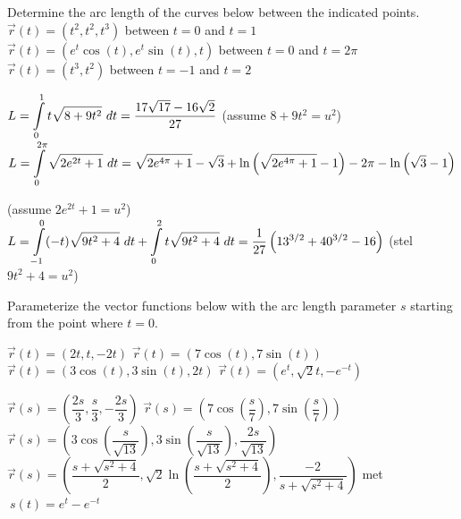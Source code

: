 \subsection*{}     
\begin{Exercise} Determine the arc length of the curves below between the indicated points.
         \Question[difficulty=1] $\vec r(t) = \left(t^2, t^2, t^3 \right)$ \qquad  between \quad $t=0$ and $t=1$
         \Question[difficulty=3] $\vec r(t) = \left(e^t \cos(t), e^t \sin(t), t \right)$ \qquad  between \quad $t=0$ and $t=2\pi$
         \Question[difficulty=2] $\vec r(t) = \left(t^3, t^2 \right)$ \qquad between \quad $t=-1$ and $t=2$
\end{Exercise}

\begin{Answer}
    
         \Question 
         $L =\displaystyle \int\limits_0^1 t \sqrt{8+9t^2}\ dt = \dfrac{17 \sqrt{17} - 16 \sqrt{2}}{27}$ \qquad (assume $8+9t^2 = u^2$)
         \Question
          $L = \displaystyle \int\limits_0^{2\pi}  \sqrt{2e^{2t}+1}\ dt = \sqrt{2e^{4 \pi}+1}-\sqrt{3}+\ln \left(\sqrt{2e^{4 \pi}+1} -1 \right) - 2 \pi - \ln \left( \sqrt{3}-1 \right)$ 
          
           (assume $2e^{2t}+1 = u^2$)
          \Question 
          $L = \displaystyle \int\limits_{-1}^0 (-t) \sqrt{9t^2+4}\ dt + \int\limits_{0}^2 t \sqrt{9t^2+4}\ dt = \dfrac{1}{27} \left( 13^{3/2} + 40^{3/2} - 16\right)$ \qquad (stel $9t^2 + 4 = u^2$)
     
\end{Answer}

\begin{Exercise}  Parameterize the vector functions below with the arc length parameter $s$ starting from the point where $t=0$.
     \begin{multicols}{2}
     	\Question[difficulty=1] $\vec r(t) = \left(2t, t, -2t \right)$ 
     	\Question[difficulty=1] $\vec r(t) = \left(7 \cos(t), 7 \sin(t) \right)$ 
     	\Question[difficulty=2] $\vec r(t) = \left(3 \cos(t), 3 \sin(t), 2t \right)$ 
     	\Question[difficulty=3] $\vec r(t)= \left(e^t, \sqrt{2}t, -e^{-t} \right)$  
        \EndCurrentQuestion
	 \end{multicols}
\end{Exercise}

\begin{Answer}
    
     	\Question $\vec r(s)= \left(\dfrac{2s}{3}, \dfrac{s}{3}, -\dfrac{2s}{3} \right) $
     	\Question $\vec r(s) = \left(7 \cos \left(\dfrac{s}{7}\right), 7 \sin \left(\dfrac{s}{7}\right) \right)$  
     	\Question $\vec r(s)= \left(3\cos\left( \dfrac{s}{\sqrt{13}}\right), 3\sin\left( \dfrac{s}{\sqrt{13}}\right), \dfrac{2s}{\sqrt{13}}\right) $
     \Question $\vec r(s)= \left( \dfrac{s + \sqrt{s^2+4}}{2}, \sqrt{2} \ln \left(\dfrac{s + \sqrt{s^2+4}}{2} \right), \dfrac{-2}{s + \sqrt{s^2+4}}  \right)$ \quad met $\ s(t) =  e^t-e^{-t}$
    
\end{Answer}

